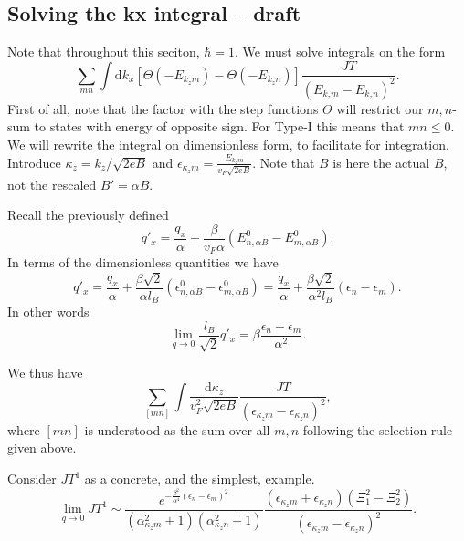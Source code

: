 \subsection{Solving the kx integral -- draft}
Note that throughout this seciton, \( \hbar = 1 \).
We must solve integrals on the form
\begin{equation}
  \label{eq:61}
  \sum_{mn} \int \mathrm{d} k_x [ \Theta (-E_{k_z m}) - \Theta (-E_{k_z n} ) ]
  \frac{
    J T
  }{
    ( E_{k_z m } - E_{k_z n} )^2
  }.
\end{equation}
First of all, note that the factor with the step functions \( \Theta  \) will restrict our \( m,n \)-sum to states with energy of opposite sign.
For Type-I this means that \( m n \leq 0 \).
We will rewrite the integral on dimensionless form, to facilitate for integration.
Introduce \( \kappa _z = k_z / \sqrt{2 eB}  \) and \( \epsilon _{\kappa _z m} = \frac{E_{k_z m}}{v_{F } \sqrt{2 eB} } \).
Note that \( B \) is here the actual \( B \), not the rescaled \( B' = \alpha B \).

Recall the previously defined
\[
  q' _x = \frac{q_x}{\alpha } + \frac{\beta}{v_{F} \alpha }( E^0_{n,\alpha B} - E^0_{m, \alpha B} ).
\]
In terms of the dimensionless quantities we have
\[
  q' _x = \frac{q_x}{\alpha } + \frac{\beta \sqrt{2} }{\alpha l_B }( \epsilon ^0_{n,\alpha B} - \epsilon ^0_{m, \alpha B} )
  = \frac{q_x}{\alpha } + \frac{\beta \sqrt{2} }{\alpha^2 l_{B} }( \epsilon_n - \epsilon_m ).
\]
In other words
\[
\lim_{q\to 0} \frac{l_B}{\sqrt{2} } q'_x = \beta \frac{\epsilon_n-\epsilon_m}{\alpha ^2}.
\]

We thus have
\begin{equation}
  \label{eq:62}
  \sum\limits_{[mn]}^{}
  \int  \frac{\mathrm{d} \kappa _z}{v_F^2 \sqrt{2 eB}}
  \frac{
    J T
  }{
    (\epsilon_{\kappa _z m} - \epsilon_{\kappa _z n})^2
  },
\end{equation}
where \( [mn] \) is understood as the sum over all \( m,n \) following the selection rule given above.

Consider \( J T^1 \) as a concrete, and the simplest, example.
\begin{equation}
  \label{eq:63}
  \lim_{q\to 0} J T^1 \sim \frac{e^{- \frac{\beta^2}{\alpha ^4} ( \epsilon _n - \epsilon _m )^2}}{
    (\alpha_{\kappa _{z} m}^2 + 1)(\alpha_{\kappa _{z} n}^2 + 1)
  }
  \frac{(\epsilon_{\kappa _z m} + \epsilon_{\kappa _z n}) ( \Xi _1^2 - \Xi _2^2 )}{
(\epsilon_{\kappa _{z} m} - \epsilon_{\kappa _{z} n}) ^2
  }.
\end{equation}

